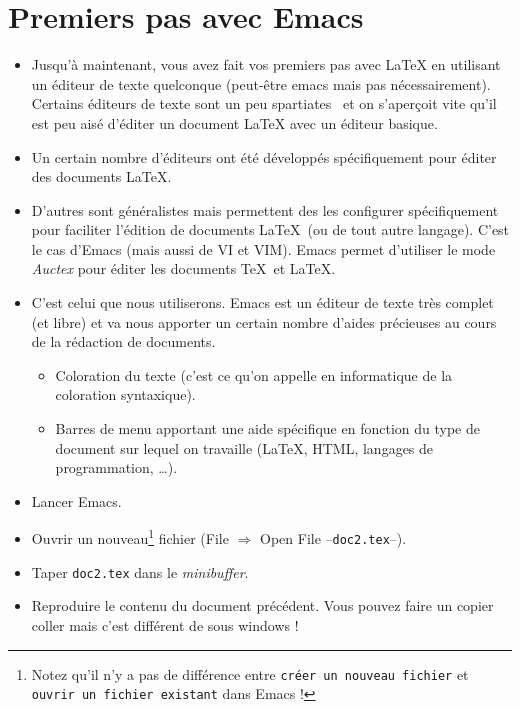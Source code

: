 
\section{Premiers pas avec Emacs}
\label{emacs}

\vfill
\begin{itemize}
\item Jusqu'à maintenant, vous avez fait vos premiers pas avec
  \LaTeX{} en utilisant un éditeur de texte quelconque (peut-être
  emacs mais pas nécessairement). Certains éditeurs de texte sont un
  peu \og spartiates \fg\ et on s'aperçoit vite qu'il est peu aisé
  d'éditer un document \LaTeX{} avec un éditeur basique.
\item Un certain nombre d'éditeurs ont été développés spécifiquement
  pour éditer des documents \LaTeX.
\item D'autres sont généralistes mais permettent des les configurer
  spécifiquement pour faciliter l'édition de documents \LaTeX\ (ou de
  tout autre langage). C'est le cas d'Emacs (mais aussi de VI et
  VIM). Emacs permet d'utiliser le mode \emph{Auctex} pour éditer les
  documents \TeX\ et \LaTeX.
\item C'est celui que nous utiliserons. Emacs est un éditeur de texte
  très complet (et libre) et va nous apporter un certain nombre
  d'aides précieuses au cours de la rédaction de documents.
  \begin{itemize}
  \item Coloration du texte (c'est ce qu'on appelle en informatique de
    la coloration syntaxique).
  \item Barres de menu apportant une aide spécifique en fonction du
    type de document sur lequel on travaille (\LaTeX, HTML, langages
    de programmation, \ldots).
  \end{itemize}
\item Lancer Emacs.
\item Ouvrir un nouveau\footnote{Notez qu'il n'y a pas de différence
    entre \texttt{créer un nouveau fichier} et \texttt{ouvrir un
      fichier existant} dans Emacs !} fichier (File $\Rightarrow$ Open
  File --\texttt{doc2.tex}--).
\item Taper \texttt{doc2.tex} dans le \emph{minibuffer}.
\item Reproduire le contenu du document précédent. Vous pouvez faire
  un copier coller mais c'est différent de sous windows !
\end{itemize}

\vfill

